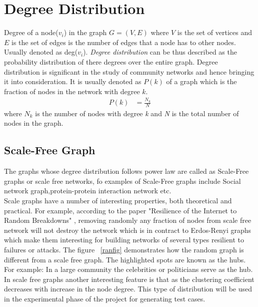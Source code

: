 \section{Degree Distribution}
Degree of a node($v_i$) in the graph $G = (V,E)$ where $V$ is the set of vertices and $E$ is the set of edges is the number of edges that a  node has to other nodes. Usually denoted as deg($v_i$). \textit{Degree distribution} can be thus described as the probability distribution of there degrees over the entire graph.  Degree distribution is significant in the study of community networks and hence bringing it into consideration.  It is usually denoted as $P(k)$ of a graph which is the fraction of nodes in the network with degree $k$.
\begin{equation}
\begin{split}
P(k) &= \frac{N_k}{N}
\end{split}
\end{equation}
where $N_k$ is the number of  nodes with degree \textit{k} and \textit{N} is the total number of nodes in the graph.
\subsection{Scale-Free Graph}
The graphs whose degree distribution follows power law are called as Scale-Free graphs or scale free networks, fo examples of Scale-Free graphs include Social network graph,protein-protein interaction network etc. \\
Scale graphs have a number of interesting properties, both theoretical and practical. For example, according to the paper  "Resilience of the Internet to Random Breakdowns" \cite{scalefree}, removing randomly any fraction of nodes from scale free network will not destroy the network which is in contract to Erdos-Renyi graphs which make them interesting for building networks of several types resilient to failures or attacks. The figure ~\ref{ranfig} demonstrates how the random graph is different from a scale free graph.  The highlighted spots are known as the hubs. For example: In a large community the celebrities or politicians serve as the hub. In scale free graphs another interesting feature is that as the clustering coefficient decreases with increase in the node degree. This type of distribution will be used in the experimental phase of the project for generating test cases. 


